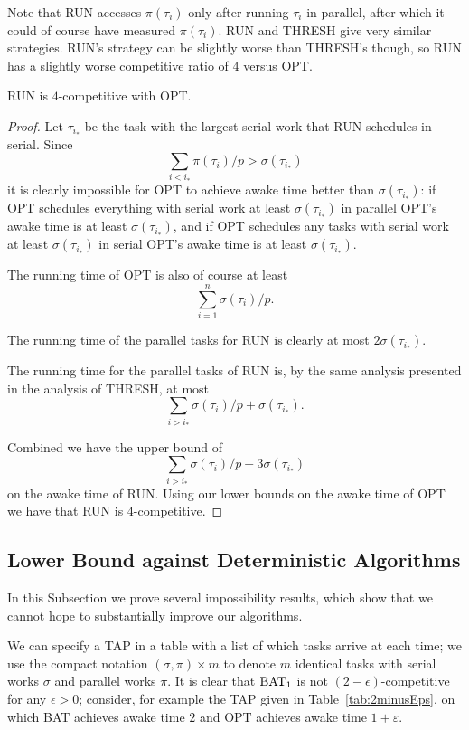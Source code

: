 Note that RUN accesses $\pi(\tau_i)$ only after running $\tau_i$
in parallel, after which it could of course have measured
$\pi(\tau_i)$. RUN and THRESH give very similar strategies.
RUN's strategy can be slightly worse than THRESH's though, so RUN
has a slightly worse competitive ratio of $4$ versus OPT.

\begin{proposition}
  RUN is $4$-competitive with OPT.
\end{proposition}
\begin{proof}
  Let $\tau_{i_*}$ be the task with the largest serial work that
  RUN schedules in serial.
  Since $$\sum_{i < i_*} \pi(\tau_i) / p > \sigma(\tau_{i_*})$$
  it is clearly impossible for OPT to achieve awake time better
  than $\sigma(\tau_{i_*})$: if OPT schedules everything with
  serial work at least $\sigma(\tau_{i_*})$ in parallel OPT's
  awake time is at least $\sigma(\tau_{i_*})$, and if OPT
  schedules any tasks with serial work at least
  $\sigma(\tau_{i_*})$ in serial OPT's awake time is at least
  $\sigma(\tau_{i_*})$.

  The running time of OPT is also of course at least 
  $$\sum_{i=1}^n \sigma(\tau_i)/p.$$

  The running time of the parallel tasks for RUN is clearly at
  most $2\sigma(\tau_{i_*})$.

  The running time for the parallel tasks of RUN is, by the same
  analysis presented in the analysis of THRESH, at most 
  $$\sum_{i > i_*}\sigma(\tau_i) / p + \sigma(\tau_{i_*}).$$

  Combined we have the upper bound of 
  $$\sum_{i > i_*}\sigma(\tau_i) / p + 3\sigma(\tau_{i_*})$$ 
  on the awake time of RUN. Using our lower bounds on the awake
  time of OPT we have that RUN is $4$-competitive.

\end{proof}

\subsection{Lower Bound against Deterministic Algorithms}
In this Subsection we prove several impossibility results, which
show that we cannot hope to substantially improve our algorithms.

We can specify a TAP in a table with a list of which tasks arrive
at each time; we use the compact notation $(\sigma, \pi)\times m$
to denote $m$ identical tasks with serial works $\sigma$ and
parallel works $\pi$. It is clear that $\operatorname{\text{BAT}}_1$ is not
$(2-\epsilon)$-competitive for any $\epsilon > 0$; consider, for
example the TAP given in Table~\ref{tab:2minusEps}, on which BAT
achieves awake time $2$ and OPT achieves awake time
$1+\varepsilon$.

